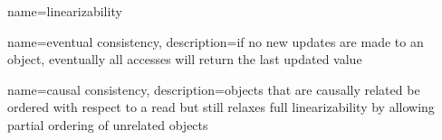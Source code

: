 %
%
%
%

{
    name=linearizability
}

{
    name={eventual consistency},
    description={if no new updates are made to an object, eventually all accesses will return the last updated value}
}

{
    name={causal consistency},
    description={objects that are causally related be ordered with respect to a read but still relaxes full linearizability by allowing partial ordering of unrelated objects}
}
